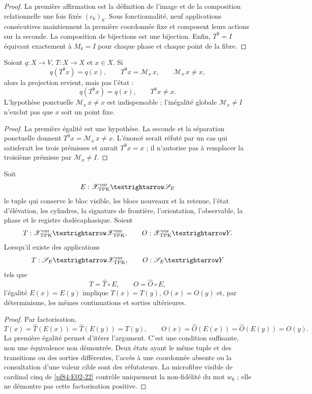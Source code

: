 \begin{proof}
La première affirmation est la définition de l'image et de la composition relationnelle une
fois fixés \((c_k)_k\). Sous
fonctionnalité, neuf applications consécutives maintiennent la première
coordonnée fixe et composent leurs actions sur la seconde. La composition de
bijections est une bijection. Enfin, \(T^9=I\) équivaut exactement à
\(M_k=I\) pour chaque phase et chaque point de la fibre.
\end{proof}

\begin{corollary}
\label{pf84:E02-29}
Soient \(q:X\to V\), \(T:X\to X\) et \(x\in X\). Si
\[
 q(T^9x)=q(x),\qquad
 T^9x=\mathcal M_x\,x,\qquad
 \mathcal M_x\,x\ne x,
\]
alors la projection revient, mais pas l'état :
\[
 q(T^9x)=q(x),\qquad T^9x\ne x.
\]
L'hypothèse ponctuelle \(\mathcal M_x\,x\ne x\) est indispensable ; l'inégalité
globale \(\mathcal M_x\ne I\) n'exclut pas que \(x\) soit un point fixe.
\end{corollary}

\begin{proof}
La première égalité est une hypothèse. La seconde et la séparation ponctuelle donnent
\(T^9x=\mathcal M_x\,x\ne x\). L'énoncé serait réfuté par un cas qui
satisferait les trois prémisses et aurait \(T^9x=x\) ; il n'autorise pas à remplacer la
troisième prémisse par \(\mathcal M_x\ne I\).
\end{proof}

\begin{theorem}
\label{pf84:E02-30}
Soit
\[
 E:\mathscr X_{\rm TPK}^{\rm enr}\longrightarrow\mathscr S_E
\]
le tuple qui conserve le bloc visible, les blocs nouveaux et la retenue, l'état
d'élévation, les cylindres, la signature de frontière, l'orientation, l'observable, la phase et le
registre dodécaphasique. Soient
\[
 T:\mathscr X_{\rm TPK}^{\rm enr}\to
 \mathscr X_{\rm TPK}^{\rm enr},
 \qquad
 O:\mathscr X_{\rm TPK}^{\rm enr}\to Y.
\]
Lorsqu'il existe des applications
\[
 \widehat T:\mathscr S_E\to\mathscr X_{\rm TPK}^{\rm enr},
 \qquad
 \widehat O:\mathscr S_E\to Y
\]
tels que
\[
 T=\widehat T\circ E,\qquad O=\widehat O\circ E,
\]
l'égalité \(E(x)=E(y)\) implique \(T(x)=T(y)\), \(O(x)=O(y)\) et, par
déterminisme, les mêmes continuations et sorties ultérieures.
\end{theorem}

\begin{proof}
Par factorisation,
\[
 T(x)=\widehat T(E(x))=\widehat T(E(y))=T(y),
 \qquad
 O(x)=\widehat O(E(x))=\widehat O(E(y))=O(y).
\]
La première égalité permet d'itérer l'argument. C'est une condition
suffisante, non une équivalence non démontrée. Deux états ayant le même tuple et
des transitions ou des sorties différentes, l'accès à une coordonnée absente ou la
consultation d'une valeur cible sont des réfutateurs. La microfibre visible de
cardinal cinq de \cref{pf84:E02-22} contrôle uniquement la non-fidélité du
mot \(w_6\) ; elle ne démontre pas cette factorisation positive.
\end{proof}

